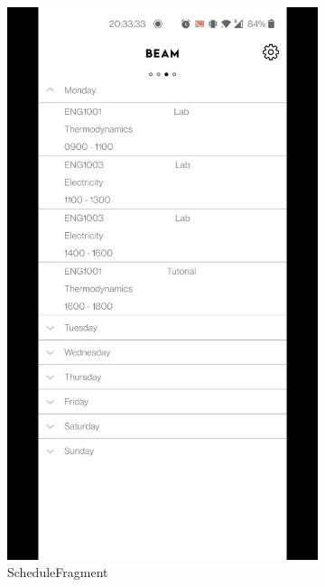 \documentclass[../report.tex]{subfiles}
\begin{document}
\begin{figure} [H]
\begin{subfigure}[b]{0.28\textwidth}
		\includegraphics[width=\textwidth]{../images/07/02-app-schedule.jpg}
		\caption{ScheduleFragment}
		\label{fig:app-schedule-frag}
	\end{subfigure}
	\hspace{0.1\textwidth}
	\begin{subfigure}[b]{0.28\textwidth}
		\centering

\end{subfigure}
\end{figure}
\end{document}
